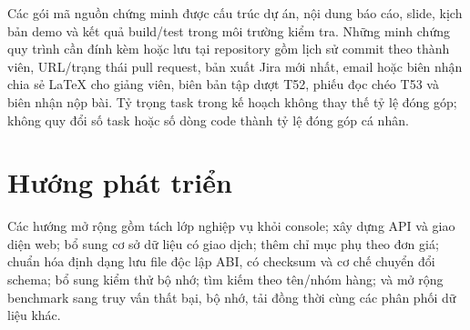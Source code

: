 Các gói mã nguồn chứng minh được cấu trúc dự án, nội dung báo cáo, slide, kịch bản demo và kết quả build/test trong môi trường kiểm tra. Những minh chứng quy trình cần đính kèm hoặc lưu tại repository gồm lịch sử commit theo thành viên, URL/trạng thái pull request, bản xuất Jira mới nhất, email hoặc biên nhận chia sẻ LaTeX cho giảng viên, biên bản tập dượt T52, phiếu đọc chéo T53 và biên nhận nộp bài. Tỷ trọng task trong kế hoạch không thay thế tỷ lệ đóng góp; không quy đổi số task hoặc số dòng code thành tỷ lệ đóng góp cá nhân.

\section*{Hướng phát triển}
Các hướng mở rộng gồm tách lớp nghiệp vụ khỏi console; xây dựng API và giao diện web; bổ sung cơ sở dữ liệu có giao dịch; thêm chỉ mục phụ theo đơn giá; chuẩn hóa định dạng lưu file độc lập ABI, có checksum và cơ chế chuyển đổi schema; bổ sung kiểm thử bộ nhớ; tìm kiếm theo tên/nhóm hàng; và mở rộng benchmark sang truy vấn thất bại, bộ nhớ, tải đồng thời cùng các phân phối dữ liệu khác.
